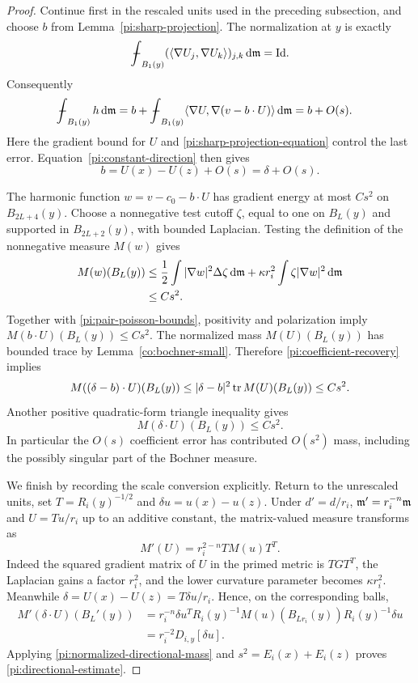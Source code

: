 \begin{proof}
Continue first in the rescaled units used in the preceding
subsection, and choose $b$ from
Lemma~\ref{pi:sharp-projection}.  The normalization at $y$ is
exactly
\[
 \fint_{B_1(y)}
   (\langle\nabla U_j,\nabla U_k\rangle)_{j,k}\dd\m=\Id.
\]
Consequently
\begin{align*}
 \fint_{B_1(y)}h\dd\m
 &=b+\fint_{B_1(y)}
       \langle\nabla U,\nabla(v-b\cdot U)\rangle\dd\m
 =b+O(s).
\end{align*}
Here the gradient bound for $U$ and
\eqref{pi:sharp-projection-equation} control the last error.
Equation~\eqref{pi:constant-direction} then gives
\begin{equation}
 b=U(x)-U(z)+O(s)=\delta+O(s).
 \label{pi:coefficient-recovery}
\end{equation}

The harmonic function $w=v-c_0-b\cdot U$ has gradient energy
at most $Cs^2$ on $B_{2L+4}(y)$.  Choose a nonnegative test
cutoff $\zeta$, equal to one on $B_L(y)$ and supported in
$B_{2L+2}(y)$, with bounded Laplacian.  Testing the definition
of the nonnegative measure $M(w)$ gives
\begin{align}
 M(w)(B_L(y))
 &\le\frac12\int|\nabla w|^2\Delta\zeta\,\mathrm d\mathfrak m
    +\kappa r_i^2\int\zeta|\nabla w|^2\,\mathrm d\mathfrak m\notag\\
 &\le Cs^2.
 \label{pi:residual-mass}
\end{align}
Together with \eqref{pi:pair-poisson-bounds}, positivity and
polarization imply $M(b\cdot U)(B_L(y))\le Cs^2$.
The normalized mass $M(U)(B_L(y))$ has bounded trace by
Lemma~\ref{co:bochner-small}.  Therefore
\eqref{pi:coefficient-recovery} implies
\[
 M((\delta-b)\cdot U)(B_L(y))
 \le|\delta-b|^2\operatorname{tr} M(U)(B_L(y))\le Cs^2.
\]
Another positive quadratic-form triangle inequality gives
\begin{equation}
 M(\delta\cdot U)(B_L(y))\le Cs^2.
 \label{pi:normalized-directional-mass}
\end{equation}
In particular the $O(s)$ coefficient error has contributed
$O(s^2)$ mass, including the possibly singular part of the
Bochner measure.

We finish by recording the scale conversion explicitly.  Return
to the unrescaled units, set $T=R_i(y)^{-1/2}$ and
$\delta u=u(x)-u(z)$.  Under $d'=d/r_i$, $\mathfrak m'=r_i^{-n}\mathfrak m$
and $U=Tu/r_i$ up to an additive constant, the matrix-valued
measure transforms as
\begin{equation}
 M'(U)=r_i^{2-n}T M(u)T^T.
 \label{pi:matrix-measure-scaling}
\end{equation}
Indeed the squared gradient matrix of $U$ in the primed metric
is $TGT^T$, the Laplacian gains a factor $r_i^2$, and the lower
curvature parameter becomes $\kappa r_i^2$.  Meanwhile
$\delta=U(x)-U(z)=T\delta u/r_i$.  Hence, on the corresponding
balls,
\begin{align*}
 M'(\delta\cdot U)(B_L'(y))
 &=r_i^{-n}\delta u^TR_i(y)^{-1}
       M(u)(B_{Lr_i}(y))R_i(y)^{-1}\delta u\\
 &=r_i^{-2}D_{i,y}[\delta u].
\end{align*}
Applying \eqref{pi:normalized-directional-mass} and
$s^2=E_i(x)+E_i(z)$ proves
\eqref{pi:directional-estimate}.
\end{proof}

